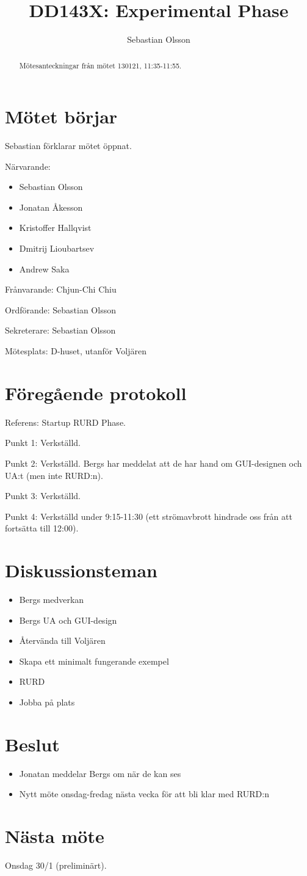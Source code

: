 \documentclass[a4paper,12pt]{article}
\author{Sebastian Olsson}
\title{DD143X: Experimental Phase}
\begin{document}
\maketitle
\begin{abstract}
    Mötesanteckningar från mötet 130121, 11:35-11:55.
\end{abstract}

\section{Mötet börjar}
Sebastian förklarar mötet öppnat.

Närvarande:
\begin{itemize}
\item Sebastian Olsson
\item Jonatan Åkesson
\item Kristoffer Hallqvist
\item Dmitrij Lioubartsev
\item Andrew Saka
\end{itemize}
Frånvarande: Chjun-Chi Chiu

Ordförande: Sebastian Olsson

Sekreterare: Sebastian Olsson

Mötesplats: D-huset, utanför Voljären

\section{Föregående protokoll}
Referens: Startup RURD Phase.

Punkt 1: Verkställd.

Punkt 2: Verkställd. Bergs har meddelat att de har hand om GUI-designen och UA:t (men inte RURD:n).

Punkt 3: Verkställd.

Punkt 4: Verkställd under 9:15-11:30 (ett strömavbrott hindrade oss från att fortsätta till 12:00).

\section{Diskussionsteman}
\begin{itemize}
\item Bergs medverkan
\item Bergs UA och GUI-design
\item Återvända till Voljären
\item Skapa ett minimalt fungerande exempel
\item RURD
\item Jobba på plats
\end{itemize}

\section{Beslut}
\begin{itemize}
\item Jonatan meddelar Bergs om när de kan ses
\item Nytt möte onsdag-fredag nästa vecka för att bli klar med RURD:n
\end{itemize}

\section{Nästa möte}
Onsdag 30/1 (preliminärt).
\end{document}
